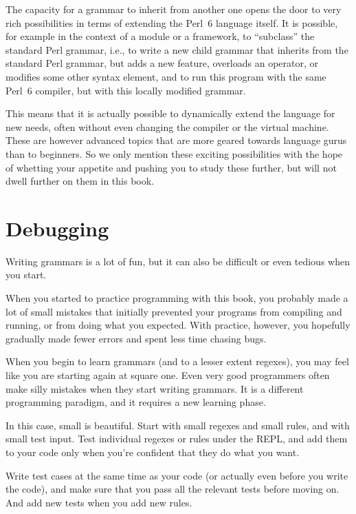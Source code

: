 The capacity for a grammar to inherit from another one opens 
the door to very rich possibilities in terms of 
extending the Perl~6 language itself. It is possible, for 
example in the context of a module or a framework, to ``subclass'' 
the standard Perl grammar, i.e., to write a new child grammar that 
inherits from the standard Perl grammar, but adds a new 
feature, overloads an operator, or modifies some other syntax 
element, and to run this program with the same Perl~6 compiler,
but with this locally modified grammar.

This means that it is actually possible to dynamically extend 
the language for new needs, often without even changing the compiler 
or the virtual machine. These are however advanced topics that 
are more geared towards language gurus than to beginners. So 
we only mention these exciting possibilities with the hope of 
whetting your appetite and pushing you to study these further, 
but will not dwell further on them in this book.

\section{Debugging}

Writing grammars is a lot of fun, but it can also be difficult 
or even tedious when you start.

When you started to practice programming with this book, you probably 
made a lot of small mistakes that initially prevented your 
programs from compiling and running, or from doing what 
you expected. With practice, however, you hopefully gradually 
made fewer errors and spent less time chasing bugs.

When you begin to learn grammars (and to a lesser extent regexes), 
you may feel like you are starting again at square one. Even 
very good programmers often make silly mistakes when they start 
writing grammars. It is a different programming paradigm, and 
it requires a new learning phase.

In this case, small is beautiful. Start with small regexes and 
small rules, and with small test input. Test individual regexes 
or rules under the REPL, and add them to your code only when 
you're confident that they do what you want.

Write test cases at the same time as your code (or actually even 
before you write the code), and make sure that you pass all the 
relevant tests before moving on. And add new tests when you add 
new rules.

